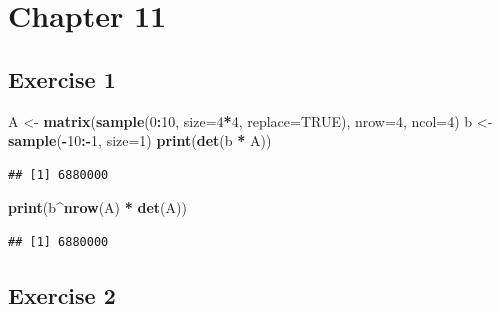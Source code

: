 \documentclass[
]{book}
\newenvironment{Shaded}{\begin{snugshade}}{\end{snugshade}}
\newcommand{\DataTypeTok}[1]{\textcolor[rgb]{0.13,0.29,0.53}{#1}}
\newcommand{\DecValTok}[1]{\textcolor[rgb]{0.00,0.00,0.81}{#1}}
\newcommand{\KeywordTok}[1]{\textcolor[rgb]{0.13,0.29,0.53}{\textbf{#1}}}
\newcommand{\NormalTok}[1]{#1}
\newcommand{\OperatorTok}[1]{\textcolor[rgb]{0.81,0.36,0.00}{\textbf{#1}}}
\newcommand{\OtherTok}[1]{\textcolor[rgb]{0.56,0.35,0.01}{#1}}
\newcommand{\StringTok}[1]{\textcolor[rgb]{0.31,0.60,0.02}{#1}}
\begin{document}
\hypertarget{chapter-11-1}{%
\section*{Chapter 11}\label{chapter-11-1}}

\hypertarget{exercise-1-7}{%
\subsection*{Exercise 1}\label{exercise-1-7}}

\begin{Shaded}
\begin{Highlighting}[]
\NormalTok{A \textless{}{-}}\StringTok{ }\KeywordTok{matrix}\NormalTok{(}\KeywordTok{sample}\NormalTok{(}\DecValTok{0}\OperatorTok{:}\DecValTok{10}\NormalTok{, }\DataTypeTok{size=}\DecValTok{4}\OperatorTok{*}\DecValTok{4}\NormalTok{, }\DataTypeTok{replace=}\OtherTok{TRUE}\NormalTok{), }\DataTypeTok{nrow=}\DecValTok{4}\NormalTok{, }\DataTypeTok{ncol=}\DecValTok{4}\NormalTok{)}
\NormalTok{b \textless{}{-}}\StringTok{ }\KeywordTok{sample}\NormalTok{(}\OperatorTok{{-}}\DecValTok{10}\OperatorTok{:{-}}\DecValTok{1}\NormalTok{, }\DataTypeTok{size=}\DecValTok{1}\NormalTok{)}
\KeywordTok{print}\NormalTok{(}\KeywordTok{det}\NormalTok{(b }\OperatorTok{*}\StringTok{ }\NormalTok{A))}
\end{Highlighting}
\end{Shaded}

\begin{verbatim}
## [1] 6880000
\end{verbatim}

\begin{Shaded}
\begin{Highlighting}[]
\KeywordTok{print}\NormalTok{(b}\OperatorTok{\^{}}\KeywordTok{nrow}\NormalTok{(A) }\OperatorTok{*}\StringTok{ }\KeywordTok{det}\NormalTok{(A))}
\end{Highlighting}
\end{Shaded}

\begin{verbatim}
## [1] 6880000
\end{verbatim}

\hypertarget{exercise-2-7}{%
\subsection*{Exercise 2}\label{exercise-2-7}}
\end{document}
